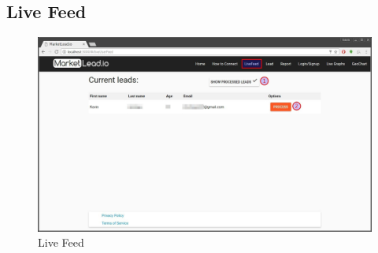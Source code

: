 \documentclass{article}
\begin{document}
		\subsection{Live Feed}
			\begin{figure}[H]
				\includegraphics[width=\textwidth]{images/live_feed.jpg}
				\caption{Live Feed}
			\end{figure}
\end{document}
